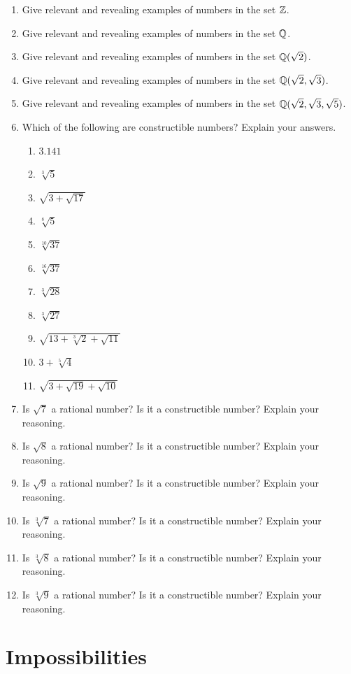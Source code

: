 \begin{problems}
\begin{enumerate}
\item Give relevant and revealing examples of numbers in the set $\mathbb Z$.
\item Give relevant and revealing examples of numbers in the set $\mathbb Q$.
\item Give relevant and revealing examples of numbers in the set
  $\mathbb Q(\sqrt{2})$.
\item Give relevant and revealing examples of numbers in the set
  $\mathbb Q(\sqrt{2},\sqrt{3})$.
\item Give relevant and revealing examples of numbers in the set
  $\mathbb Q(\sqrt{2},\sqrt{3},\sqrt{5})$.
\item Which of the following are constructible numbers? Explain your
  answers.
\begin{enumerate} 
\item $3.141$
\item $\sqrt[3]{5}$
\item $\sqrt{3 + \sqrt{17}}$
\item $\sqrt[8]{5}$
\item $\sqrt[10]{37}$
\item $\sqrt[16]{37}$
\item $\sqrt[3]{28}$
\item $\sqrt[3]{27}$
\item $\sqrt{13+\sqrt[3]{2} + \sqrt{11}}$
\item $3+ \sqrt[5]{4}$
\item $\sqrt{3+\sqrt{19} + \sqrt{10}}$
\end{enumerate}
\item Is $\sqrt{7}$ a rational number? Is it a constructible number?
  Explain your reasoning.
\item Is $\sqrt{8}$ a rational number? Is it a constructible number?
  Explain your reasoning.
\item Is $\sqrt{9}$ a rational number? Is it a constructible number?
  Explain your reasoning.
\item Is $\sqrt[3]{7}$ a rational number? Is it a constructible
  number? Explain your reasoning.
\item Is $\sqrt[3]{8}$ a rational number? Is it a constructible
  number? Explain your reasoning.
\item Is $\sqrt[3]{9}$ a rational number? Is it a constructible
  number? Explain your reasoning.
\end{enumerate}
\end{problems}

\newpage


\section{Impossibilities}

